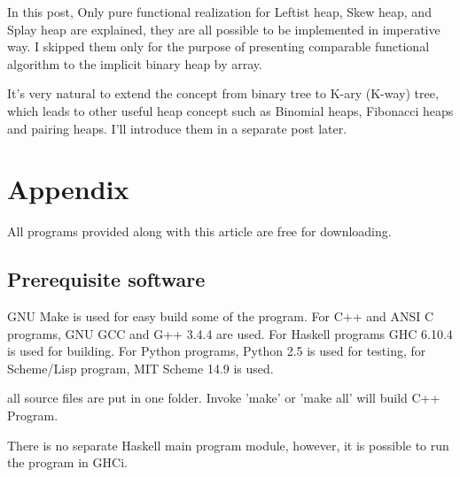 \documentclass{article}
\begin{document}
In this post, Only pure functional realization for Leftist heap,
Skew heap, and Splay heap are explained, they are all possible to
be implemented in imperative way. I skipped them only for the
purpose of presenting comparable functional algorithm to the
implicit binary heap by array.

It's very natural to extend the concept from binary tree to
K-ary (K-way) tree, which leads to other useful heap concept such as
Binomial heaps, Fibonacci heaps and pairing heaps. I'll introduce
them in a separate post later.

\section{Appendix} \label{appendix}
All programs provided along with this article are free for
downloading.

\subsection{Prerequisite software}
GNU Make is used for easy build some of the program. For C++ and ANSI C programs,
GNU GCC and G++ 3.4.4 are used.
For Haskell programs GHC 6.10.4 is used
for building. For Python programs, Python 2.5 is used for testing, for
Scheme/Lisp program, MIT Scheme 14.9 is used.

all source files are put in one folder. Invoke 'make' or 'make all'
will build C++ Program.

There is no separate Haskell main program module, however, it is possible to run the program in GHCi.
\end{document}
